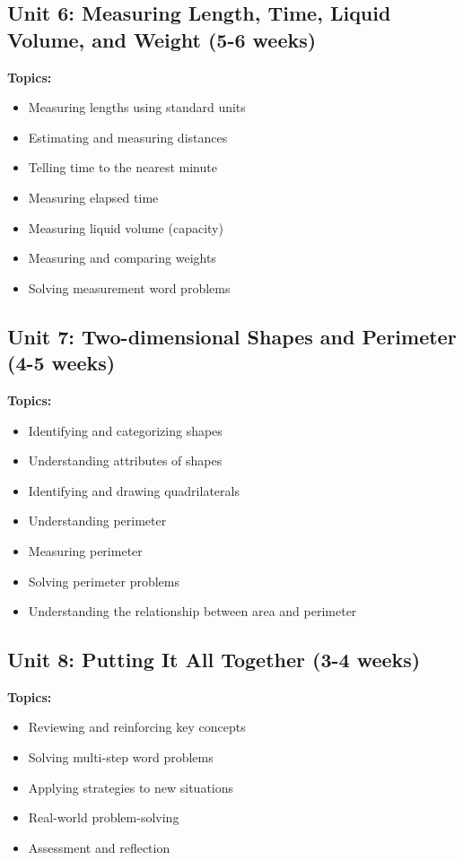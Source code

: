 \documentclass[11pt,letterpaper]{report}
\begin{document}
\subsection{Unit 6: Measuring Length, Time, Liquid Volume, and Weight (5-6 weeks)}

\textbf{Topics:}
\begin{itemize}
    \item Measuring lengths using standard units
    \item Estimating and measuring distances
    \item Telling time to the nearest minute
    \item Measuring elapsed time
    \item Measuring liquid volume (capacity)
    \item Measuring and comparing weights
    \item Solving measurement word problems
\end{itemize}

\subsection{Unit 7: Two-dimensional Shapes and Perimeter (4-5 weeks)}

\textbf{Topics:}
\begin{itemize}
    \item Identifying and categorizing shapes
    \item Understanding attributes of shapes
    \item Identifying and drawing quadrilaterals
    \item Understanding perimeter
    \item Measuring perimeter
    \item Solving perimeter problems
    \item Understanding the relationship between area and perimeter
\end{itemize}

\subsection{Unit 8: Putting It All Together (3-4 weeks)}

\textbf{Topics:}
\begin{itemize}
    \item Reviewing and reinforcing key concepts
    \item Solving multi-step word problems
    \item Applying strategies to new situations
    \item Real-world problem-solving
    \item Assessment and reflection
\end{itemize}
\end{document}
